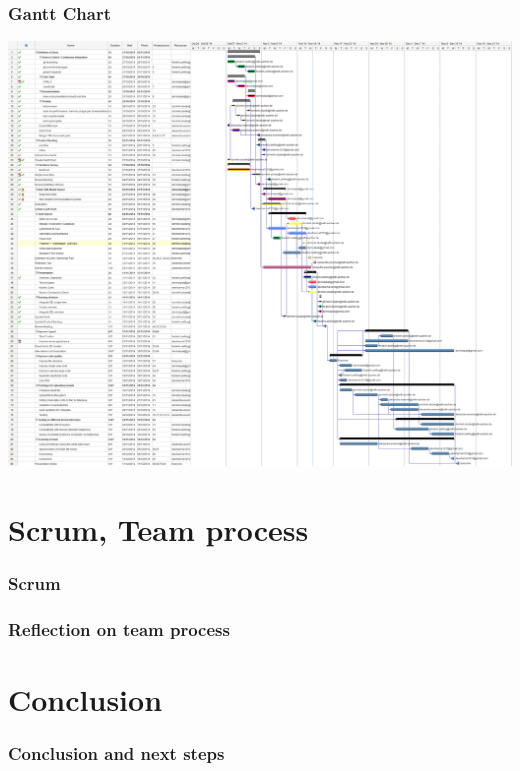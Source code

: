 \begin{frame}
  \frametitle{Gantt Chart}
  \includegraphics[width=1.2\textwidth, height=0.7\textwidth]{images/gantt_chart.png}\\
\end{frame}

\section{Scrum, Team process}

\begin{frame}
  \frametitle{Scrum}
\end{frame}

\begin{frame}
  \frametitle{Reflection on team process}
\end{frame}

\section{Conclusion}

\begin{frame}
  \frametitle{Conclusion and next steps}
\end{frame}


